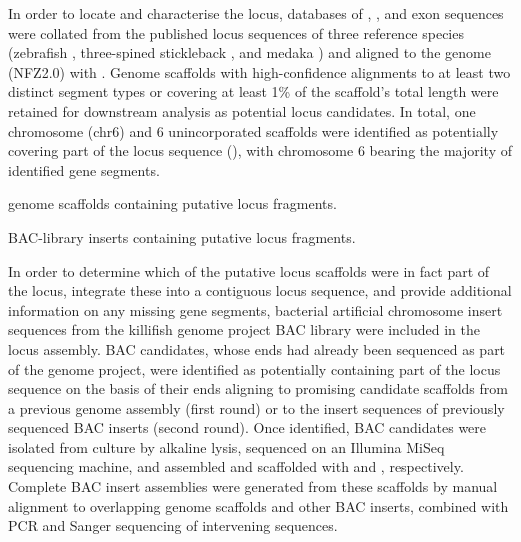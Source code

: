 In order to locate and characterise the \nfu \igh{} locus, databases of \vh, \jh, and \ch exon sequences were collated from the published locus sequences of three reference species (zebrafish \parencite{danilova2005zebrafish}, three-spined stickleback \parencite{bao2010stickleback,gambondeza2011stickleback}, and medaka \parencite{magadan2011medaka}) and aligned to the \nfu genome (NFZ2.0) with  \parencite{altschul1990blast,altschul1997blast}. Genome scaffolds with high-confidence alignments to at least two distinct segment types or covering at least 1\% of the scaffold's total length were retained for downstream analysis as potential locus candidates. In total, one chromosome (chr6) and 6 unincorporated scaffolds were identified as potentially covering part of the locus sequence (), with chromosome 6 bearing the majority of identified gene segments.  %

\begin{table}[bh]
\centering
\caption{\Nfu genome scaffolds containing putative \igh{} locus fragments.}
\begin{threeparttable}

\end{threeparttable}
\label{tab:nfu-locus-scaffolds}
\end{table}

\begin{table}[bh]
\centering
\caption{\Nfu BAC-library inserts containing putative \igh{} locus fragments.}
\begin{threeparttable}

\end{threeparttable}
\label{tab:nfu-locus-bacs}
\end{table}

In order to determine which of the putative locus scaffolds were in fact part of the \igh{} locus, integrate these into a contiguous locus sequence, and provide additional information on any missing gene segments, bacterial artificial chromosome insert sequences from the killifish genome project BAC library \parencite{reichwald2015genome} were included in the locus assembly. BAC candidates, whose ends had already been sequenced as part of the genome project, were identified as potentially containing part of the locus sequence on the basis of their ends aligning to promising candidate scaffolds from a previous genome assembly (first round) or to the insert sequences of previously sequenced BAC inserts (second round). Once identified,  BAC candidates were isolated from culture by alkaline lysis, sequenced on an Illumina MiSeq sequencing machine, and assembled and scaffolded with  and , respectively. Complete BAC insert assemblies were generated from these scaffolds by manual alignment to overlapping genome scaffolds and other BAC inserts, combined with PCR and Sanger sequencing of intervening sequences.


